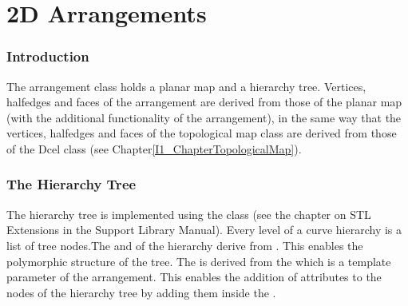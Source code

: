 



\chapter{2D Arrangements}

\subsection*{Introduction}

The arrangement class holds a planar map and a hierarchy tree.
Vertices, halfedges and faces of the arrangement are derived from
those of the planar map (with the additional functionality of
the arrangement), in the same way that the vertices, halfedges and faces 
of the topological map class are derived from those of the Dcel class
(see Chapter\ref{I1_ChapterTopologicalMap}).

\subsection*{The Hierarchy Tree}

The hierarchy tree is implemented using the 
class (see the chapter on STL Extensions in the Support Library Manual). 
Every level of a curve
hierarchy is a list of tree nodes.The  and 
 of 
the hierarchy derive from . This enables the
polymorphic structure of the tree. The  is
derived from the  which is a template parameter
of the arrangement. This enables the addition of attributes to the nodes
of the hierarchy tree by adding them inside the .

